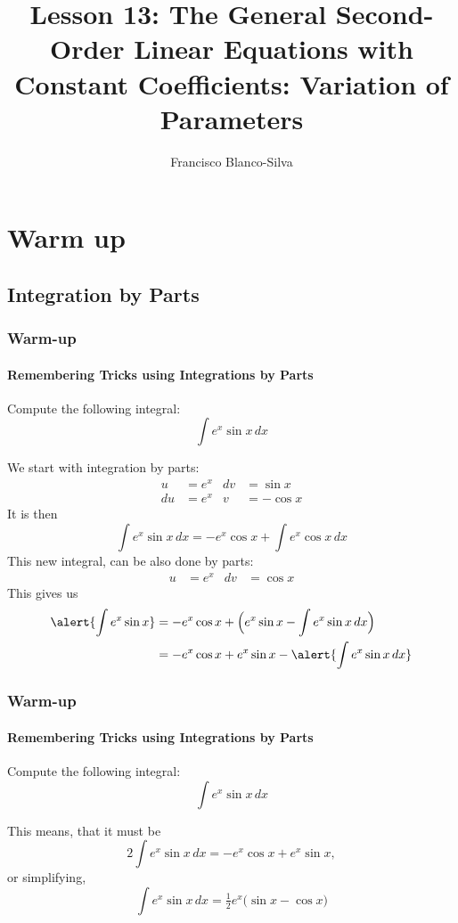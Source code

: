 \documentclass[9pt,xcolor=x11names,compress]{beamer}
\author[Francisco Blanco-Silva]{Francisco Blanco-Silva}
\institute[USC]{University of South Carolina}
\date{
\pgfdeclarelindenmayersystem{Funny curve}{
\rule{X -> X+YF+}
  \rule{Y -> -FX-Y}}
	\begin{tikzpicture} 
    \draw [DeepSkyBlue4]
    [l-system={Funny curve, axiom=X, order=11, step=2.5pt, angle=90}]
    lindenmayer system; 
	\end{tikzpicture}
}
\title{Lesson 13: The General Second-Order Linear Equations with Constant Coefficients: Variation of Parameters}
\begin{document}
\frame{\titlepage}

\section{Warm up}
\subsection{Integration by Parts}
\begin{frame}\frametitle{Warm-up}
\framesubtitle{Remembering Tricks using Integrations by Parts}
   \begin{block}
    	{Compute the following integral:}
    	\begin{equation*}
    		\int e^x\sin x\, dx
    	\end{equation*}
    \end{block} 
    \pause We start with integration by parts:
    \begin{align*}
    	u&=e^x & dv&=\sin x \\
    	du&=e^x &v&= -\cos x
    \end{align*}
    It is then
    \begin{equation*}
    	\int e^x\sin x\, dx = -e^x\cos x + \int e^x\cos x\, dx
    \end{equation*}
    \pause This new integral, can be also done by parts:
    \begin{align*}
    	u&=e^x &dv&=\cos x
    \end{align*}
    This gives us
    \begin{align*}
    	\alert{\int e^x\sin x} &= -e^x\cos x + \Big( e^x\sin x - \int e^x\sin x\, dx\Big) \\
    	&= -e^x\cos x + e^x\sin x - \alert{\int e^x\sin x\, dx}
    \end{align*}
\end{frame}

\begin{frame}\frametitle{Warm-up}
\framesubtitle{Remembering Tricks using Integrations by Parts}
   \begin{block}
    	{Compute the following integral:}
    	\begin{equation*}
    		\int e^x\sin x\, dx
    	\end{equation*}
    \end{block} 
    This means, that it must be
    \begin{equation*}
    2 \int e^x\sin x\, dx = -e^x\cos x + e^x\sin x,
    \end{equation*}
    or simplifying,
    \begin{equation*}
    \int e^x\sin x\, dx = \tfrac{1}{2} e^x \big( \sin x - \cos x \big)
    \end{equation*}

    \vspace{2.5cm}
\end{frame}
\end{document}
